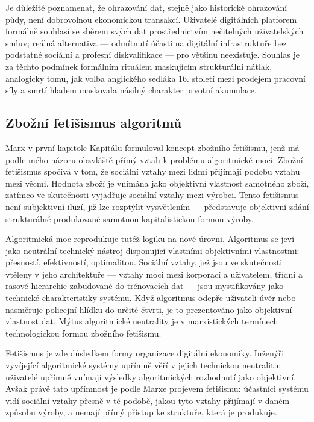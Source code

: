 Je důležité poznamenat, že ohrazování dat, stejně jako historické ohrazování půdy, není dobrovolnou ekonomickou transakcí.
Uživatelé digitálních platforem formálně souhlasí se sběrem svých dat prostřednictvím nečitelných uživatelských smluv; reálná alternativa — odmítnutí účasti na digitální infrastruktuře bez podstatné sociální a profesní diskvalifikace — pro většinu neexistuje. Souhlas je za těchto podmínek formálním rituálem maskujícím strukturální nátlak, analogicky tomu, jak  volba anglického sedláka 16. století mezi prodejem pracovní síly a smrtí hladem maskovala násilný charakter prvotní akumulace.

\subsection{Zbožní fetišismus algoritmů}

Marx v první kapitole Kapitálu formuloval koncept zbožního fetišismu, jenž má podle mého názoru obzvláště přímý vztah k problému algoritmické moci.
Zbožní fetišismus spočívá v tom, že sociální vztahy mezi lidmi přijímají podobu vztahů mezi věcmi. Hodnota zboží je vnímána jako objektivní vlastnost samotného zboží, zatímco ve skutečnosti vyjadřuje sociální vztahy mezi výrobci. Tento fetišismus není subjektivní iluzí, již lze rozptýlit vysvětlením — představuje objektivní zdání strukturálně produkované samotnou kapitalistickou formou výroby.

Algoritmická moc reprodukuje tutéž logiku na nové úrovni.
Algoritmus se jeví jako neutrální technický nástroj disponující vlastními objektivními vlastnostmi: přesností, efektivností, optimalitou. Sociální vztahy, jež jsou ve skutečnosti vtěleny v jeho architektuře — vztahy moci mezi korporací a uživatelem, třídní a rasové hierarchie zabudované do trénovacích dat — jsou mystifikovány jako technické charakteristiky systému. Když algoritmus odepře uživateli úvěr nebo nasměruje policejní hlídku do určité čtvrti, je to prezentováno jako objektivní vlastnost dat. Mýtus algoritmické neutrality je v marxistických termínech technologickou formou zbožního fetišismu.

Fetišismus je zde důsledkem formy organizace digitální ekonomiky.
Inženýři vyvíjející algoritmické systémy upřímně věří v jejich technickou neutralitu; uživatelé upřímně vnímají výsledky algoritmických rozhodnutí jako objektivní. Avšak právě tato upřímnost je podle Marxe projevem fetišismu: účastníci systému vidí sociální vztahy přesně v té podobě, jakou tyto vztahy přijímají v daném způsobu výroby, a nemají přímý přístup ke struktuře, která je produkuje.

